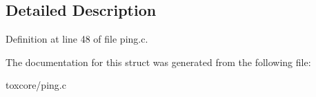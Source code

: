 \subsection{Detailed Description}


Definition at line 48 of file ping.\+c.



The documentation for this struct was generated from the following file\+:\begin{DoxyCompactItemize}
\item 
toxcore/ping.\+c\end{DoxyCompactItemize}
